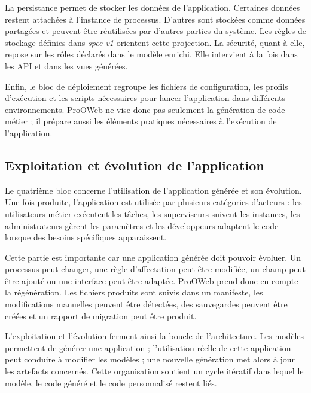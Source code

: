 La persistance permet de stocker les données de l'application. Certaines données restent attachées à l'instance de processus. D'autres sont stockées comme données partagées et peuvent être réutilisées par d'autres parties du système. Les règles de stockage définies dans \textit{spec-v1} orientent cette projection. La sécurité, quant à elle, repose sur les rôles déclarés dans le modèle enrichi. Elle intervient à la fois dans les API et dans les vues générées.

Enfin, le bloc de déploiement regroupe les fichiers de configuration, les profils d'exécution et les scripts nécessaires pour lancer l'application dans différents environnements. ProOWeb ne vise donc pas seulement la génération de code métier ; il prépare aussi les éléments pratiques nécessaires à l'exécution de l'application.

\subsection{Exploitation et évolution de l'application}

Le quatrième bloc concerne l'utilisation de l'application générée et son évolution. Une fois produite, l'application est utilisée par plusieurs catégories d'acteurs : les utilisateurs métier exécutent les tâches, les superviseurs suivent les instances, les administrateurs gèrent les paramètres et les développeurs adaptent le code lorsque des besoins spécifiques apparaissent.

Cette partie est importante car une application générée doit pouvoir évoluer. Un processus peut changer, une règle d'affectation peut être modifiée, un champ peut être ajouté ou une interface peut être adaptée. ProOWeb prend donc en compte la régénération. Les fichiers produits sont suivis dans un manifeste, les modifications manuelles peuvent être détectées, des sauvegardes peuvent être créées et un rapport de migration peut être produit.

L'exploitation et l'évolution ferment ainsi la boucle de l'architecture. Les modèles permettent de générer une application ; l'utilisation réelle de cette application peut conduire à modifier les modèles ; une nouvelle génération met alors à jour les artefacts concernés. Cette organisation soutient un cycle itératif dans lequel le modèle, le code généré et le code personnalisé restent liés.

